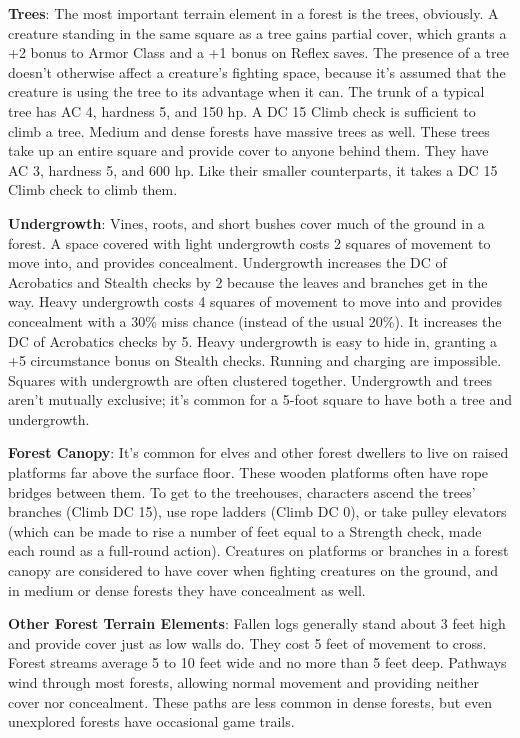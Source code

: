 \textbf{Trees}: The most important terrain element in a forest is the trees, obviously. A creature standing in the same square as a tree gains partial cover, which grants a +2 bonus to Armor Class and a +1 bonus on Reflex saves. The presence of a tree doesn't otherwise affect a creature's fighting space, because it's assumed that the creature is using the tree to its advantage when it can. The trunk of a typical tree has AC 4, hardness 5, and 150 hp. A DC 15 Climb check is sufficient to climb a tree. Medium and dense forests have massive trees as well. These trees take up an entire square and provide cover to anyone behind them. They have AC 3, hardness 5, and 600 hp. Like their smaller counterparts, it takes a DC 15 Climb check to climb them.
				
\textbf{Undergrowth}: Vines, roots, and short bushes cover much of the ground in a forest. A space covered with light undergrowth costs 2 squares of movement to move into, and provides concealment. Undergrowth increases the DC of Acrobatics and Stealth checks by 2 because the leaves and branches get in the way. Heavy undergrowth costs 4 squares of movement to move into and provides concealment with a 30\% miss chance (instead of the usual 20\%). It increases the DC of Acrobatics checks by 5. Heavy undergrowth is easy to hide in, granting a +5 circumstance bonus on Stealth checks. Running and charging are impossible. Squares with undergrowth are often clustered together. Undergrowth and trees aren't mutually exclusive; it's common for a 5-foot square to have both a tree and undergrowth.
				
\textbf{Forest Canopy}: It's common for elves and other forest dwellers to live on raised platforms far above the surface floor. These wooden platforms often have rope bridges between them. To get to the treehouses, characters ascend the trees' branches (Climb DC 15), use rope ladders (Climb DC 0), or take pulley elevators (which can be made to rise a number of feet equal to a Strength check, made each round as a full-round action). Creatures on platforms or branches in a forest canopy are considered to have cover when fighting creatures on the ground, and in medium or dense forests they have concealment as well.
				
\textbf{Other Forest Terrain Elements}: Fallen logs generally stand about 3 feet high and provide cover just as low walls do. They cost 5 feet of movement to cross. Forest streams average 5 to 10 feet wide and no more than 5 feet deep. Pathways wind through most forests, allowing normal movement and providing neither cover nor concealment. These paths are less common in dense forests, but even unexplored forests have occasional game trails.
				
